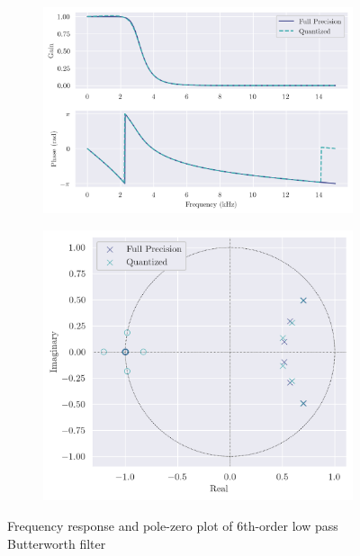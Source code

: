 \begin{figure}[ht]
    \centering
    \begin{subfigure}[b]{0.56\textwidth}
        \centering
        \includegraphics[width=\textwidth]{images/q8_6th_freqz.png}
    \end{subfigure}
    \hfill
    \begin{subfigure}[b]{0.43\textwidth}
        \centering
        \includegraphics[width=\textwidth]{images/q8_6th_zp.png}
    \end{subfigure}
    \caption{Frequency response and pole-zero plot of 6th-order low pass Butterworth filter}
\end{figure}

